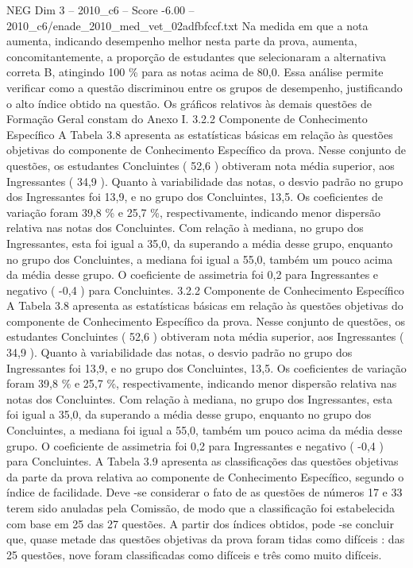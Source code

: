 \begin{textsample}{NEG Dim 3 – 2010\_c6 – Score -6.00 – 2010\_c6/enade\_2010\_med\_vet\_02adfbfccf.txt}
Na medida em que a nota aumenta, indicando desempenho melhor nesta parte da prova, aumenta, concomitantemente, a proporção de estudantes que selecionaram a alternativa correta B, atingindo 100 \% para as notas acima de 80,0.
Essa análise permite verificar como a questão discriminou entre os grupos de desempenho, justificando o alto índice obtido na questão.
Os gráficos relativos às demais questões de Formação Geral constam do Anexo I. 3.2.2 Componente de Conhecimento Específico A Tabela 3.8 apresenta as estatísticas básicas em relação às questões objetivas do componente de Conhecimento Específico da prova.
Nesse conjunto de questões, os estudantes Concluintes ( 52,6 ) obtiveram nota média superior, aos Ingressantes ( 34,9 ).
Quanto à variabilidade das notas, o desvio padrão no grupo dos Ingressantes foi 13,9, e no grupo dos Concluintes, 13,5.
Os coeficientes de variação foram 39,8 \% e 25,7 \%, respectivamente, indicando menor dispersão relativa nas notas dos Concluintes.
Com relação à mediana, no grupo dos Ingressantes, esta foi igual a 35,0, da superando a média desse grupo, enquanto no grupo dos Concluintes, a mediana foi igual a 55,0, também um pouco acima da média desse grupo.
O coeficiente de assimetria foi 0,2 para Ingressantes e negativo ( -0,4 ) para Concluintes. 3.2.2 Componente de Conhecimento Específico A Tabela 3.8 apresenta as estatísticas básicas em relação às questões objetivas do componente de Conhecimento Específico da prova.
Nesse conjunto de questões, os estudantes Concluintes ( 52,6 ) obtiveram nota média superior, aos Ingressantes ( 34,9 ).
Quanto à variabilidade das notas, o desvio padrão no grupo dos Ingressantes foi 13,9, e no grupo dos Concluintes, 13,5.
Os coeficientes de variação foram 39,8 \% e 25,7 \%, respectivamente, indicando menor dispersão relativa nas notas dos Concluintes.
Com relação à mediana, no grupo dos Ingressantes, esta foi igual a 35,0, da superando a média desse grupo, enquanto no grupo dos Concluintes, a mediana foi igual a 55,0, também um pouco acima da média desse grupo.
O coeficiente de assimetria foi 0,2 para Ingressantes e negativo ( -0,4 ) para Concluintes.
A Tabela 3.9 apresenta as classificações das questões objetivas da parte da prova relativa ao componente de Conhecimento Específico, segundo o índice de facilidade.
Deve -se considerar o fato de as questões de números 17 e 33 terem sido anuladas pela Comissão, de modo que a classificação foi estabelecida com base em 25 das 27 questões.
A partir dos índices obtidos, pode -se concluir que, quase metade das questões objetivas da prova foram tidas como difíceis : das 25 questões, nove foram classificadas como difíceis e três como muito difíceis.

\end{textsample}
